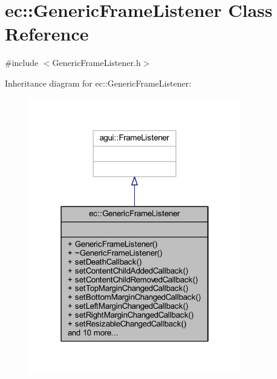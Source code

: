 \hypertarget{classec_1_1_generic_frame_listener}{}\section{ec\+:\+:Generic\+Frame\+Listener Class Reference}
\label{classec_1_1_generic_frame_listener}


{\ttfamily \#include $<$Generic\+Frame\+Listener.\+h$>$}



Inheritance diagram for ec\+:\+:Generic\+Frame\+Listener\+:\nopagebreak
\begin{figure}[H]
\begin{center}
\leavevmode
\includegraphics[width=262pt]{classec_1_1_generic_frame_listener__inherit__graph}
\end{center}
\end{figure}


